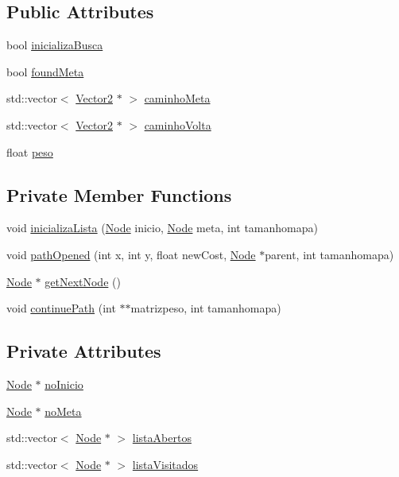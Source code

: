 \subsection*{Public Attributes}
\begin{DoxyCompactItemize}
\item 
bool \hyperlink{classBusca__a_a81c36e73b7bee7079ce00617b4f6ad51}{inicializa\+Busca}
\item 
bool \hyperlink{classBusca__a_a52388dc808f1ea2343e739a3e0025dfd}{found\+Meta}
\item 
std\+::vector$<$ \hyperlink{structVector2}{Vector2} $\ast$ $>$ \hyperlink{classBusca__a_ad14fbc1b7c5e830161c6889b7c4c6d3f}{caminho\+Meta}
\item 
std\+::vector$<$ \hyperlink{structVector2}{Vector2} $\ast$ $>$ \hyperlink{classBusca__a_a8d0d37ee53d3d9cf4d69a4f6e24f6c8e}{caminho\+Volta}
\item 
float \hyperlink{classBusca__a_abfc5d1b31430b3aa91439ee44468e0e6}{peso}
\end{DoxyCompactItemize}
\subsection*{Private Member Functions}
\begin{DoxyCompactItemize}
\item 
void \hyperlink{classBusca__a_ab02900e76a563ccb100ce83ecbf96660}{inicializa\+Lista} (\hyperlink{classNode}{Node} inicio, \hyperlink{classNode}{Node} meta, int tamanhomapa)
\item 
void \hyperlink{classBusca__a_a762c5b4a508658689ad8c7b218c6238c}{path\+Opened} (int x, int y, float new\+Cost, \hyperlink{classNode}{Node} $\ast$parent, int tamanhomapa)
\item 
\hyperlink{classNode}{Node} $\ast$ \hyperlink{classBusca__a_af1bd3a125d7363f1b3d9025ae50bbc74}{get\+Next\+Node} ()
\item 
void \hyperlink{classBusca__a_adb02d829d41341fdb8670207b35a0bb7}{continue\+Path} (int $\ast$$\ast$matrizpeso, int tamanhomapa)
\end{DoxyCompactItemize}
\subsection*{Private Attributes}
\begin{DoxyCompactItemize}
\item 
\hyperlink{classNode}{Node} $\ast$ \hyperlink{classBusca__a_ad60d0bcbabc1677bfe701b9bb6f8ccf6}{no\+Inicio}
\item 
\hyperlink{classNode}{Node} $\ast$ \hyperlink{classBusca__a_ae9276b091e39db37bfef34dc0fa5c19b}{no\+Meta}
\item 
std\+::vector$<$ \hyperlink{classNode}{Node} $\ast$ $>$ \hyperlink{classBusca__a_a75cdf1a045b9836fd8e61604846fa436}{lista\+Abertos}
\item 
std\+::vector$<$ \hyperlink{classNode}{Node} $\ast$ $>$ \hyperlink{classBusca__a_aa5749eb61eb84cb8eed28cab69a114cd}{lista\+Visitados}
\end{DoxyCompactItemize}


